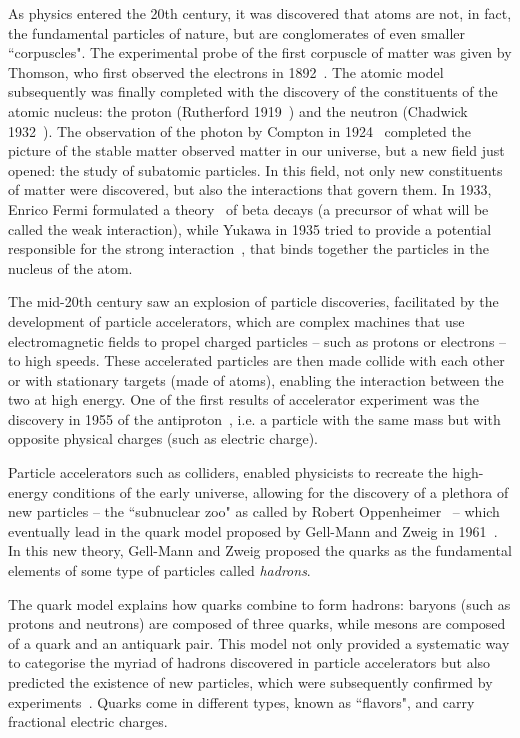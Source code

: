 As physics entered the 20th century, it was discovered that atoms are not, in fact, the fundamental particles of nature, but are conglomerates of even smaller ``corpuscles". The experimental probe of the first corpuscle of matter was given by Thomson, who first observed the electrons in 1892~\cite{doi:10.1080/14786449708621070}. The atomic model subsequently was finally completed with the discovery of the constituents of the atomic nucleus: the proton (Rutherford 1919~\cite{doi:10.1080/14786440608635919}) and the neutron (Chadwick 1932~\cite{Chadwick:1932ma}). The observation of the photon by Compton in 1924~\cite{PhysRev.21.483, PhysRev.24.591} completed the picture of the stable matter observed matter in our universe, but a new field just opened: the study of subatomic particles. In this field, not only new constituents of matter were discovered, but also the interactions that govern them. In 1933, Enrico Fermi formulated a theory~\cite{Fermi:1934hr} of beta decays (a precursor of what will be called the weak interaction), while Yukawa in 1935 tried to provide a potential responsible for the strong interaction~\cite{Yukawa:1935xg}, that binds together the particles in the nucleus of the atom. 

The mid-20th century saw an explosion of particle discoveries, facilitated by the development of particle accelerators, which are complex machines that use electromagnetic fields to propel charged particles -- such as protons or electrons -- to high speeds. These accelerated particles are then made collide with each other or with stationary targets (made of atoms), enabling the interaction between the two at high energy. One of the first results of accelerator experiment was the discovery in 1955 of the antiproton~\cite{PhysRev.100.947}, i.e. a particle with the same mass but with opposite physical charges (such as electric charge). 

Particle accelerators such as colliders, enabled physicists to recreate the high-energy conditions of the early universe, allowing for the discovery of a plethora of new particles -- the ``subnuclear zoo" as called by Robert Oppenheimer~\cite{johnson2010strange} -- which eventually lead in the quark model proposed by Gell-Mann and Zweig in 1961~\cite{Gell-Mann:1961omu}. In this new theory,  Gell-Mann and Zweig proposed the quarks as the fundamental elements of some type of particles called \textit{hadrons}. 

The quark model explains how quarks combine to form hadrons: baryons (such as protons and neutrons) are composed of three quarks, while mesons are composed of a quark and an antiquark pair.  This model not only provided a systematic way to categorise the myriad of hadrons discovered in particle accelerators but also predicted the existence of new particles, which were subsequently confirmed by experiments~\cite{PhysRevLett.12.204}. Quarks come in different types, known as ``flavors", and carry fractional electric charges. 

